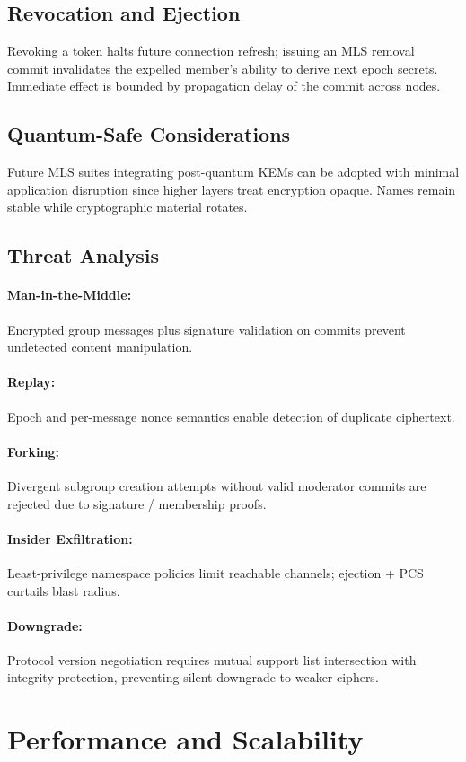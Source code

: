 \documentclass{article}
\theoremstyle{definition}
\theoremstyle{remark}
\begin{document}
\subsection{Revocation and Ejection}
Revoking a token halts future connection refresh; issuing an MLS removal commit invalidates the expelled member's ability to derive next epoch secrets. Immediate effect is bounded by propagation delay of the commit across nodes.
\subsection{Quantum-Safe Considerations}
Future MLS suites integrating post-quantum KEMs can be adopted with minimal application disruption since higher layers treat encryption opaque. Names remain stable while cryptographic material rotates.
\subsection{Threat Analysis}
\paragraph{Man-in-the-Middle:} Encrypted group messages plus signature validation on commits prevent undetected content manipulation. \paragraph{Replay:} Epoch and per-message nonce semantics enable detection of duplicate ciphertext. \paragraph{Forking:} Divergent subgroup creation attempts without valid moderator commits are rejected due to signature / membership proofs. \paragraph{Insider Exfiltration:} Least-privilege namespace policies limit reachable channels; ejection + PCS curtails blast radius. \paragraph{Downgrade:} Protocol version negotiation requires mutual support list intersection with integrity protection, preventing silent downgrade to weaker ciphers.

\section{Performance and Scalability}\label{sec:performance}
\end{document}
